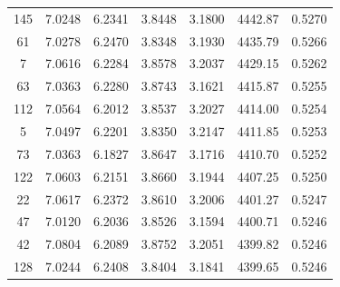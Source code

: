 \documentclass[12pt,a4paper]{article}
\begin{document}
\begin{longtable}{ccccccc}
145 & 7.0248 & 6.2341 & 3.8448 & 3.1800 & 4442.87 & 0.5270 \\
61  & 7.0278 & 6.2470 & 3.8348 & 3.1930 & 4435.79 & 0.5266 \\
7   & 7.0616 & 6.2284 & 3.8578 & 3.2037 & 4429.15 & 0.5262 \\
63  & 7.0363 & 6.2280 & 3.8743 & 3.1621 & 4415.87 & 0.5255 \\
112 & 7.0564 & 6.2012 & 3.8537 & 3.2027 & 4414.00 & 0.5254 \\
5   & 7.0497 & 6.2201 & 3.8350 & 3.2147 & 4411.85 & 0.5253 \\
73  & 7.0363 & 6.1827 & 3.8647 & 3.1716 & 4410.70 & 0.5252 \\
122 & 7.0603 & 6.2151 & 3.8660 & 3.1944 & 4407.25 & 0.5250 \\
22  & 7.0617 & 6.2372 & 3.8610 & 3.2006 & 4401.27 & 0.5247 \\
47  & 7.0120 & 6.2036 & 3.8526 & 3.1594 & 4400.71 & 0.5246 \\
42  & 7.0804 & 6.2089 & 3.8752 & 3.2051 & 4399.82 & 0.5246 \\
128 & 7.0244 & 6.2408 & 3.8404 & 3.1841 & 4399.65 & 0.5246 \\
\end{longtable}
\end{document}
